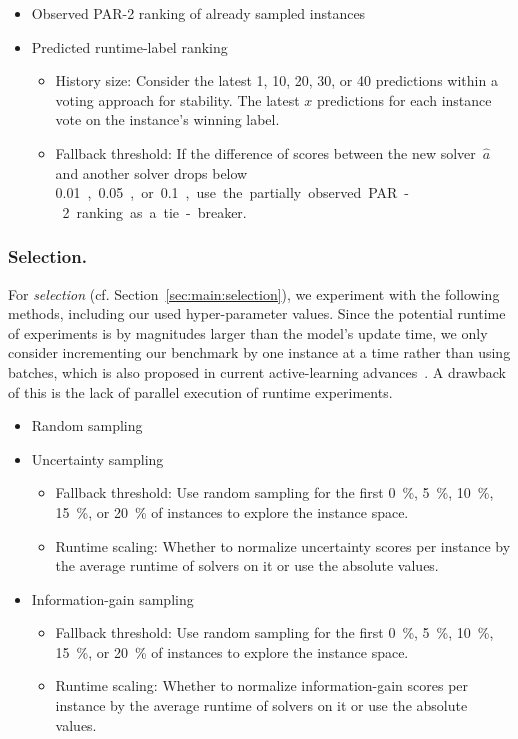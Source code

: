 \documentclass[runningheads]{llncs}
\begin{document}
\begin{itemize}
  \item Observed PAR-2 ranking of already sampled instances
  \item Predicted runtime-label ranking
  \begin{itemize}
    \item
    History size: Consider the latest 1, 10, 20, 30, or 40 predictions within a voting approach for stability.
    The latest $x$ predictions for each instance vote on the instance's winning label.
    \item
    Fallback threshold: If the difference of scores between the new solver~$\hat{a}$ and another solver drops below \SI{0.01}, \SI{0.05}, or \SI{0.1}, use the partially observed PAR-2 ranking as a tie-breaker.
  \end{itemize}
\end{itemize}

\subsubsection{Selection.}

For \emph{selection} (cf. Section~\ref{sec:main:selection}), we experiment with the following methods, including our used hyper-parameter values.
Since the potential runtime of experiments is by magnitudes larger than the model's update time, we only consider incrementing our benchmark by one instance at a time rather than using batches, which is also proposed in current active-learning advances~\cite{SinhaED19,2019gaal}.
A drawback of this is the lack of parallel execution of runtime experiments.

\begin{itemize}
  \item Random sampling 
  \item Uncertainty sampling
  \begin{itemize}
    \item Fallback threshold: Use random sampling for the first \SI{0}{\%}, \SI{5}{\%}, \SI{10}{\%}, \SI{15}{\%}, or \SI{20}{\%} of instances to explore the instance space.
    \item Runtime scaling: Whether to normalize uncertainty scores per instance by the average runtime of solvers on it or use the absolute values.
  \end{itemize}

  \item Information-gain sampling
  \begin{itemize}
    \item Fallback threshold: Use random sampling for the first \SI{0}{\%}, \SI{5}{\%}, \SI{10}{\%}, \SI{15}{\%}, or \SI{20}{\%} of instances to explore the instance space.
    \item Runtime scaling: Whether to normalize information-gain scores per instance by the average runtime of solvers on it or use the absolute values.
  \end{itemize}
\end{itemize}
\end{document}
